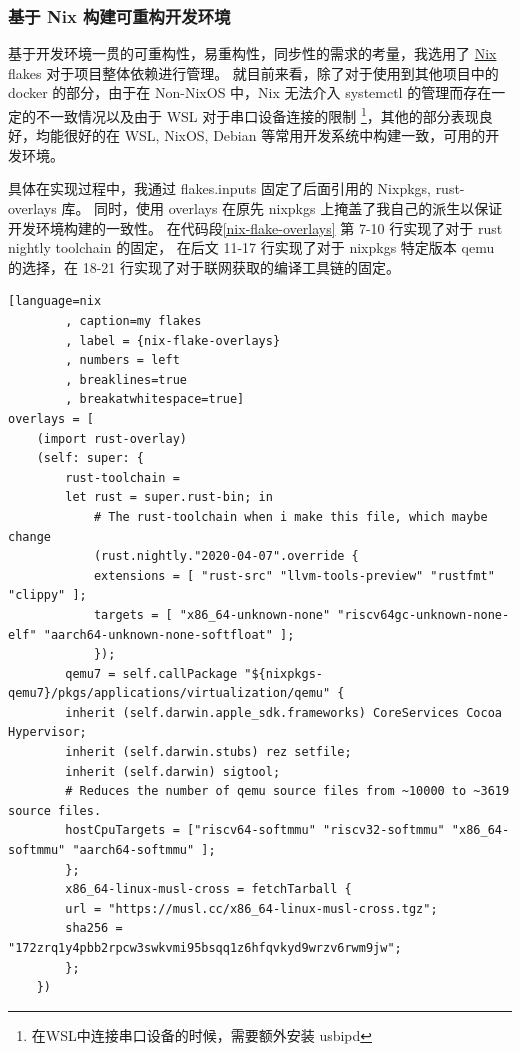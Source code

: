     \subsubsection{基于 Nix 构建可重构开发环境}

    基于开发环境一贯的可重构性，易重构性，同步性的需求的考量，我选用了 \href{https://nixos.org/}{Nix} flakes 对于项目整体依赖进行管理。
    就目前来看，除了对于使用到其他项目中的 docker 的部分，由于在 Non-NixOS 中，Nix 无法介入 systemctl 的管理而存在一定的不一致情况以及由于 WSL 对于串口设备连接的限制
    \footnote{在WSL中连接串口设备的时候，需要额外安装 usbipd}，其他的部分表现良好，均能很好的在 WSL, NixOS, Debian 等常用开发系统中构建一致，可用的开发环境。

    具体在实现过程中，我通过 flakes.inputs 固定了后面引用的 Nixpkgs, rust-overlays 库。
    同时，使用 overlays 在原先 nixpkgs 上掩盖了我自己的派生以保证开发环境构建的一致性。
    在代码段\ref{nix-flake-overlays} 第 7-10 行实现了对于 rust nightly toolchain 的固定，
    在后文 11-17 行实现了对于 nixpkgs 特定版本 qemu 的选择，在 18-21 行实现了对于联网获取的编译工具链的固定。
    
    \begin{lstlisting}[language=nix
        , caption=my flakes
        , label = {nix-flake-overlays}
        , numbers = left
        , breaklines=true
        , breakatwhitespace=true]
overlays = [ 
    (import rust-overlay)
    (self: super: {
        rust-toolchain =
        let rust = super.rust-bin; in
            # The rust-toolchain when i make this file, which maybe change
            (rust.nightly."2020-04-07".override {
            extensions = [ "rust-src" "llvm-tools-preview" "rustfmt" "clippy" ];
            targets = [ "x86_64-unknown-none" "riscv64gc-unknown-none-elf" "aarch64-unknown-none-softfloat" ];
            });
        qemu7 = self.callPackage "${nixpkgs-qemu7}/pkgs/applications/virtualization/qemu" {
        inherit (self.darwin.apple_sdk.frameworks) CoreServices Cocoa Hypervisor;
        inherit (self.darwin.stubs) rez setfile;
        inherit (self.darwin) sigtool;
        # Reduces the number of qemu source files from ~10000 to ~3619 source files.
        hostCpuTargets = ["riscv64-softmmu" "riscv32-softmmu" "x86_64-softmmu" "aarch64-softmmu" ];
        };
        x86_64-linux-musl-cross = fetchTarball {
        url = "https://musl.cc/x86_64-linux-musl-cross.tgz";
        sha256 = "172zrq1y4pbb2rpcw3swkvmi95bsqq1z6hfqvkyd9wrzv6rwm9jw";
        };
    })
    \end{lstlisting}

